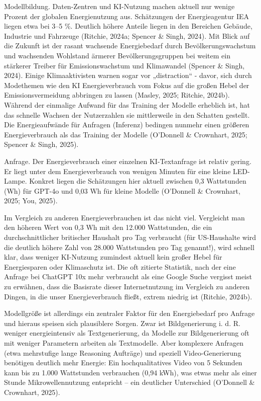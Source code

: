 \documentclass[
  ngerman,
  letterpaper,
  DIV=11]{scrreprt}
\begin{document}
Modellbildung. Daten-Zentren und KI-Nutzung machen aktuell nur wenige
Prozent der globalen Energienutzung aus. Schätzungen der Energieagentur
IEA liegen etwa bei 3--5 \%. Deutlich höhere Anteile liegen in den
Bereichen Gebäude, Industrie und Fahrzeuge (Ritchie, 2024a; Spencer \&
Singh, 2024). Mit Blick auf die Zukunft ist der rasant wachsende
Energiebedarf durch Bevölkerungswachstum und wachsenden Wohlstand
ärmerer Bevölkerungsgruppen bei weitem ein stärkerer Treiber für
Emissionswachstum und Klimawandel (Spencer \& Singh, 2024). Einige
Klimaaktivisten warnen sogar vor „distraction`` - davor, sich durch
Modethemen wie den KI Energieverbrauch vom Fokus auf die großen Hebel
der Emissionsvermeidung abbringen zu lassen (Masley, 2025; Ritchie,
2024b). Während der einmalige Aufwand für das Training der Modelle
erheblich ist, hat das schnelle Wachsen der Nutzerzahlen sie
mittlerweile in den Schatten gestellt. Die Energieaufwände für Anfragen
(Inferenz) bedingen nunmehr einen größeren Energieverbrauch als das
Training der Modelle (O'Donnell \& Crownhart, 2025; Spencer \& Singh,
2025).

Anfrage. Der Energieverbrauch einer einzelnen KI-Textanfrage ist relativ
gering. Er liegt unter dem Energieverbrauch von wenigen Minuten für eine
kleine LED-Lampe. Konkret liegen die Schätzungen hier aktuell zwischen
0,3 Wattstunden (Wh) für GPT-4o und 0,03 Wh für kleine Modelle
(O'Donnell \& Crownhart, 2025; You, 2025).

Im Vergleich zu anderen Energieverbrauchen ist das nicht viel.
Vergleicht man den höheren Wert von 0,3 Wh mit den 12.000 Wattstunden,
die ein durchschnittlicher britischer Haushalt pro Tag verbraucht (für
US-Haushalte wird die deutlich höhere Zahl von 28.000 Wattstunden pro
Tag genannt!), wird schnell klar, dass weniger KI-Nutzung zumindest
aktuell kein großer Hebel für Energiesparen oder Klimaschutz ist. Die
oft zitierte Statistik, nach der eine Anfrage bei ChatGPT 10x mehr
verbraucht als eine Google Suche vergisst meist zu erwähnen, dass die
Basisrate dieser Internetnutzung im Vergleich zu anderen Dingen, in die
unser Energieverbrauch fließt, extrem niedrig ist (Ritchie, 2024b).

Modellgröße ist allerdings ein zentraler Faktor für den Energiebedarf
pro Anfrage und hieraus speisen sich plausiblere Sorgen. Zwar ist
Bildgenerierung i. d. R. weniger energieintensiv als Textgenerierung, da
Modelle zur Bildgenerierung oft mit weniger Parametern arbeiten als
Textmodelle. Aber komplexere Anfragen (etwa mehrstufige lange Reasoning
Aufträge) und speziell Video-Generierung benötigen deutlich mehr
Energie: Ein hochqualitatives Video von 5 Sekunden kann bis zu 1.000
Wattstunden verbrauchen (0,94 kWh), was etwas mehr als einer Stunde
Mikrowellennutzung entspricht -- ein deutlicher Unterschied (O'Donnell
\& Crownhart, 2025).
\end{document}
